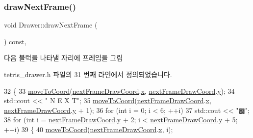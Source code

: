 \subsubsection{\texorpdfstring{draw\+Next\+Frame()}{drawNextFrame()}}
{\footnotesize\ttfamily void Drawer\+::draw\+Next\+Frame (\begin{DoxyParamCaption}{ }\end{DoxyParamCaption}) const\hspace{0.3cm}{\ttfamily [inline]}, {\ttfamily [private]}}



다음 블럭을 나타낼 자리에 프레임을 그림 



tetris\+\_\+drawer.\+h 파일의 31 번째 라인에서 정의되었습니다.


\begin{DoxyCode}
32     \{
33         \mbox{\hyperlink{class_drawer_ac1a96e007c07cab2e36a7c78484ee9a6}{moveToCoord}}(\mbox{\hyperlink{tetris__drawer_8h_a83cc61593b9fb64d690139400b3d760b}{nextFrameDrawCoord}}.\mbox{\hyperlink{struct_coord_a696eaa744360fc791d0e3b331c549dbe}{x}}, 
      \mbox{\hyperlink{tetris__drawer_8h_a83cc61593b9fb64d690139400b3d760b}{nextFrameDrawCoord}}.\mbox{\hyperlink{struct_coord_a214166cca70cef7dda9201689c3e81ab}{y}});
34         std::cout << \textcolor{stringliteral}{" N  E  X  T"};
35         \mbox{\hyperlink{class_drawer_ac1a96e007c07cab2e36a7c78484ee9a6}{moveToCoord}}(\mbox{\hyperlink{tetris__drawer_8h_a83cc61593b9fb64d690139400b3d760b}{nextFrameDrawCoord}}.\mbox{\hyperlink{struct_coord_a696eaa744360fc791d0e3b331c549dbe}{x}}, 
      \mbox{\hyperlink{tetris__drawer_8h_a83cc61593b9fb64d690139400b3d760b}{nextFrameDrawCoord}}.\mbox{\hyperlink{struct_coord_a214166cca70cef7dda9201689c3e81ab}{y}} + 1);
36         \textcolor{keywordflow}{for} (\textcolor{keywordtype}{int} i = 0; i < 6; ++i)
37             std::cout << \textcolor{stringliteral}{"▩"};
38         \textcolor{keywordflow}{for} (\textcolor{keywordtype}{int} i = \mbox{\hyperlink{tetris__drawer_8h_a83cc61593b9fb64d690139400b3d760b}{nextFrameDrawCoord}}.\mbox{\hyperlink{struct_coord_a214166cca70cef7dda9201689c3e81ab}{y}} + 2; i < 
      \mbox{\hyperlink{tetris__drawer_8h_a83cc61593b9fb64d690139400b3d760b}{nextFrameDrawCoord}}.\mbox{\hyperlink{struct_coord_a214166cca70cef7dda9201689c3e81ab}{y}} + 5; ++i)
39         \{
40             \mbox{\hyperlink{class_drawer_ac1a96e007c07cab2e36a7c78484ee9a6}{moveToCoord}}(\mbox{\hyperlink{tetris__drawer_8h_a83cc61593b9fb64d690139400b3d760b}{nextFrameDrawCoord}}.\mbox{\hyperlink{struct_coord_a696eaa744360fc791d0e3b331c549dbe}{x}}, i);

\end{DoxyCode}
